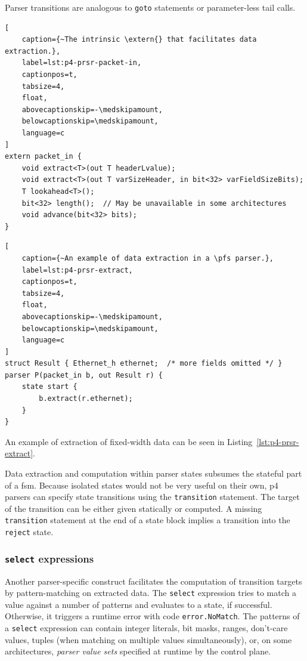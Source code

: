 Parser transitions are analogous to \texttt{goto} statements or parameter-less
tail calls.

\begin{lstlisting}[
	caption={~The intrinsic \extern{} that facilitates data extraction.},
	label=lst:p4-prsr-packet-in,
	captionpos=t,
	tabsize=4,
	float,
	abovecaptionskip=-\medskipamount,
	belowcaptionskip=\medskipamount,
	language=c
]
extern packet_in {
	void extract<T>(out T headerLvalue);
	void extract<T>(out T varSizeHeader, in bit<32> varFieldSizeBits);
	T lookahead<T>();
	bit<32> length();  // May be unavailable in some architectures
	void advance(bit<32> bits);
}
\end{lstlisting}

\begin{lstlisting}[
	caption={~An example of data extraction in a \pfs parser.},
	label=lst:p4-prsr-extract,
	captionpos=t,
	tabsize=4,
	float,
	abovecaptionskip=-\medskipamount,
	belowcaptionskip=\medskipamount,
	language=c
]
struct Result { Ethernet_h ethernet;  /* more fields omitted */ }
parser P(packet_in b, out Result r) {
	state start {
		b.extract(r.ethernet);
	}
}
\end{lstlisting}

An example of extraction of fixed-width data can be seen in
Listing~\ref{lst:p4-prsr-extract}.

Data extraction and computation within parser states subsumes the stateful part
of a \acrlong{fsm}. Because isolated states would not be very useful on their
own, \acrshort{p4} parsers can specify state transitions using the
\texttt{transition} statement. The target of the transition can be either given
statically or computed. A missing \texttt{transition} statement at the end of a
state block implies a transition into the \texttt{reject} state.

\subsubsection*{\texttt{select} expressions}

Another parser-specific construct facilitates the computation of transition
targets by pattern-matching on extracted data. The \texttt{select} expression
tries to match a value against a number of patterns and evaluates to a state, if
successful. Otherwise, it triggers a runtime error with code
\texttt{error.NoMatch}. The patterns of a \texttt{select} expression can contain
integer literals, bit masks, ranges, don't-care values, tuples (when matching on
multiple values simultaneously), or, on some architectures, \textit{parser value
sets} specified at runtime by the control plane.

